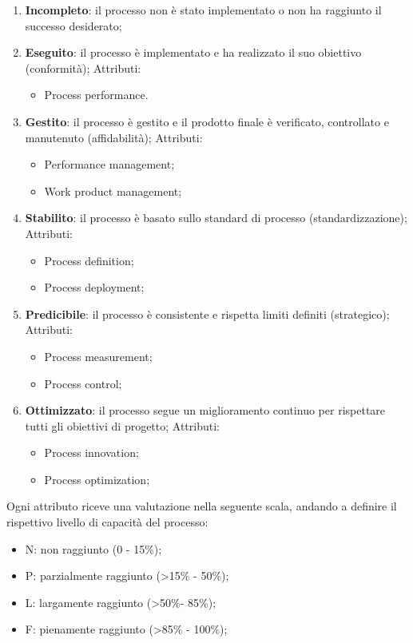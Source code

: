 \begin{enumerate}
	\item \textbf{Incompleto}: il processo non è stato implementato o non ha raggiunto il successo desiderato;
	\item \textbf{Eseguito}: il processo è implementato e ha realizzato il suo obiettivo (conformità); Attributi:
	\begin{itemize}
		\item Process performance.
	\end{itemize}
	\item \textbf{Gestito}: il processo è gestito e il prodotto finale è verificato, controllato e manutenuto (affidabilità); Attributi:
	\begin{itemize}
		\item  Performance management;
		\item  Work product management;
	\end{itemize}
	\item \textbf{Stabilito}: il processo è basato sullo standard di processo (standardizzazione); Attributi:
	\begin{itemize}
		\item  Process definition;
		\item  Process deployment;
	\end{itemize}
	\item \textbf{Predicibile}: il processo è consistente e rispetta limiti definiti (strategico); Attributi:
	\begin{itemize}
		\item  Process measurement;
		\item  Process control;
	\end{itemize}
	\item \textbf{Ottimizzato}: il processo segue un miglioramento continuo per rispettare tutti gli obiettivi di
progetto; Attributi:
	\begin{itemize}
		\item  Process innovation;
		\item  Process optimization;
	\end{itemize}
\end{enumerate}

Ogni attributo riceve una valutazione nella seguente scala, andando a definire il rispettivo livello di
capacità del processo:
\begin{itemize}
	\item N: non raggiunto (0 - 15\%);
	\item P: parzialmente raggiunto (>15\% - 50\%);
	\item L: largamente raggiunto (>50\%- 85\%);
	\item F: pienamente raggiunto (>85\% - 100\%);
\end{itemize}

